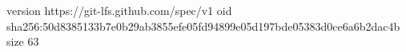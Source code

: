 version https://git-lfs.github.com/spec/v1
oid sha256:50d8385133b7e0b29ab3855efe05fd94899e05d197bde05383d0ce6a6b2dac4b
size 63
